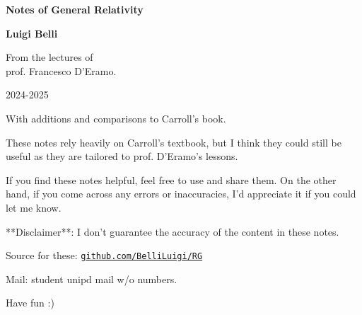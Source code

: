 \begin{titlepage}
	\begin{center}
		\vspace*{1cm}
		{\LARGE\textbf{Notes of General Relativity}}\par
		\vspace{0.5cm}
		\textbf{Luigi Belli} \par
		\vspace{1cm}
		\begin{figure}[h]
		\centering
		\end{figure}
		\vspace{1cm}
		
		 From the lectures of \\  prof. Francesco D'Eramo. \par
		 2024-2025
		 \par
		 \vspace{1cm}
		With additions and comparisons to Carroll's book.\par
		
\vfill
	\end{center}
These notes rely heavily on Carroll's textbook, but I think they could still be useful as they are tailored to prof. D'Eramo's lessons. 

If you find these notes helpful, feel free to use and share them. On the other hand, if you come across any errors or inaccuracies, I'd appreciate it if you could let me know.\par
\vspace{0.1cm}
**Disclaimer**: I don't guarantee the accuracy of the content in these notes.\par

\vspace{0.5cm}
Source for these: \texttt{\href{https://github.com/BelliLuigi/RG}{github.com/BelliLuigi/RG}}\par
Mail: student unipd mail w/o numbers.\par
\vspace{0.5cm}
Have fun :)
\end{titlepage}

